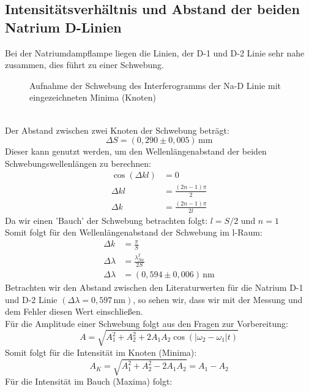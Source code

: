 \subsection{Intensitätsverhältnis und Abstand der beiden Natrium D-Linien}
Bei der Natriumdampflampe liegen die Linien, der D-1 und D-2 Linie sehr nahe zusammen, dies führt zu einer Schwebung.
\begin{figure}[h]
    \centering\scalebox{0.8}{}
    \caption{Aufnahme der Schwebung des Interferogramms der Na-D Linie mit eingezeichneten Minima (Knoten)}
\end{figure}\\
Der Abstand zwischen zwei Knoten der Schwebung beträgt:
\begin{equation}
    \Delta S=\left(0,290\pm0,005\right)\,\text{mm}%
\end{equation}
Dieser kann genutzt werden, um den Wellenlängenabstand der beiden Schwebungswellenlängen zu berechnen:%
\begin{align}
    \cos\left(\Delta kl\right)&=0\\
    \Delta kl&=\frac{\left(2n-1\right)\pi}{2}\\
    \Delta k&=\frac{\left(2n-1\right)\pi}{2l}
\end{align}
Da wir einen 'Bauch' der Schwebung betrachten folgt: $l=S/2$ und $n=1$\\
Somit folgt für den Wellenlängenabstand der Schwebung im l-Raum:
\begin{align}
    \Delta k&=\frac{\pi}{S}\\
    \Delta \lambda&=\frac{\lambda_{Na}^2}{2S}\\
    \Delta \lambda&=\left(0,594\pm0,006\right)\,\text{nm}
\end{align}
Betrachten wir den Abstand zwischen den Literaturwerten für die Natrium D-1 und D-2 Linie $(\Delta\lambda=0,597\,\text{nm})$, so sehen wir, dass wir mit der Messung und dem Fehler diesen Wert einschließen.\\
Für die Amplitude einer Schwebung folgt aus den Fragen zur Vorbereitung:
\begin{equation}
    A=\sqrt{A_1^2+A_2^2+2A_1A_2\cos(\left|\omega_2-\omega_1\right|t)}
\end{equation}
Somit folgt für die Intensität im Knoten (Minima):
\begin{equation}
    A_K=\sqrt{A_1^2+A_2^2-2A_1A_2}=A_1-A_2
\end{equation}
Für die Intensität im Bauch (Maxima) folgt:
